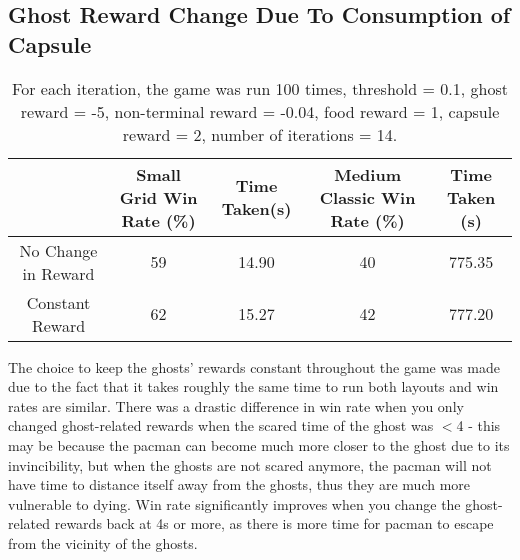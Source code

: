 \documentclass[12pt]{report}
\begin{document}
        \subsection*{Ghost Reward Change Due To Consumption of Capsule}
          \begin{table}[H]
            \begin{center}
              \begin{adjustbox}{max width=\textwidth}
              \begin{tabular}{*{5}{c}}

                \textbf{} & \textbf{Small Grid Win Rate (\%)} & \textbf{Time Taken(s)} & \textbf{Medium Classic Win Rate (\%)} & \textbf{Time Taken (s)}\\
                \hline
                      No Change in Reward & 59 & 14.90 & 40 & 775.35\\
                      Constant Reward & 62 & 15.27 & 42 & 777.20\\

              \end{tabular}
              \end{adjustbox}
              \caption{For each iteration, the game was run 100 times, threshold = 0.1, ghost reward = -5, non-terminal reward = -0.04, food reward = 1, capsule reward = 2, number of iterations = 14.}
              \label{tab:table4}
            \end{center}
          \end{table}
          \vspace{-9mm}
          The choice to keep the ghosts' rewards constant throughout the game was made due to the fact that it takes roughly the same time to run both layouts and win rates are similar. There was a drastic difference in win rate when you only changed ghost-related rewards when the scared time of the ghost was $<$4 - this may be because the pacman can become much more closer to the ghost due to its invincibility, but when the ghosts are not scared anymore, the pacman will not have time to distance itself away from the ghosts, thus they are much more vulnerable to dying. Win rate significantly improves when you change the ghost-related rewards back at 4s or more, as there is more time for pacman to escape from the vicinity of the ghosts.
\end{document}
